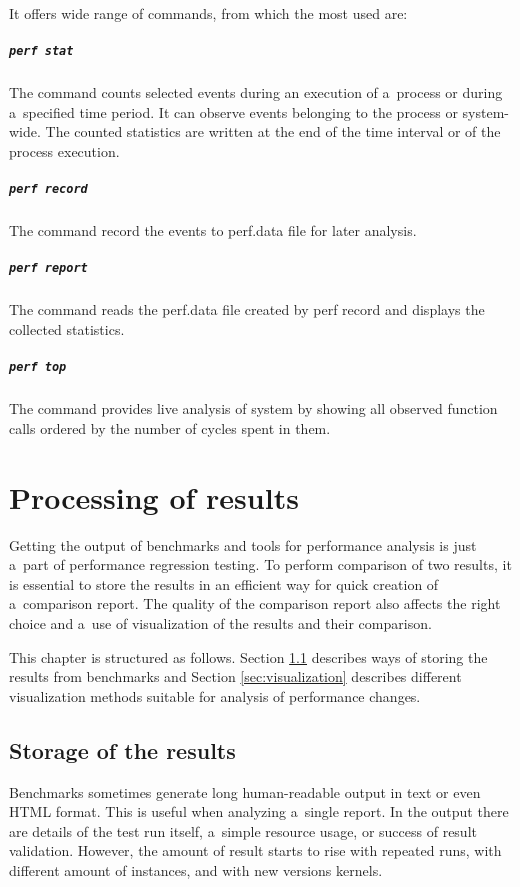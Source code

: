 It offers wide range of commands, from which the most used are:
\paragraph{\texttt{perf stat}} The command counts selected events during an
execution of a~process or during a~specified time period. It can observe events belonging
to the process or system-wide. The counted statistics are written at the end of the
time interval or of the process execution.
\paragraph{\texttt{perf record}} The command record the events to perf.data file for later
analysis.
\paragraph{\texttt{perf report}} The command reads the perf.data file created by perf record
and displays the collected statistics.
\paragraph{\texttt{perf top}} The command provides live analysis of system by showing all
observed function calls ordered by the number of cycles spent in them.



\chapter{Processing of results} \label{ch:processing}
Getting the output of benchmarks and tools for performance analysis is just
a~part of performance regression testing. To perform comparison of two results, it is
essential to store the results in an efficient way for quick creation of
a~comparison report. The quality of the comparison report also affects the right
choice and a~use of visualization of the results and their comparison.

This chapter is structured as follows. Section \ref{sec:storage} describes
ways of storing the results from benchmarks and Section \ref{sec:visualization}
describes different visualization methods suitable for analysis of performance
changes.

\section{Storage of the results} \label{sec:storage}
Benchmarks sometimes generate long human-readable output in text or even HTML
format. This is useful when analyzing a~single report. In the output there are details
of the test run itself, a~simple resource usage, or success of result validation.
However, the amount of result starts to rise with repeated runs, with different
amount of instances, and with new versions kernels.

